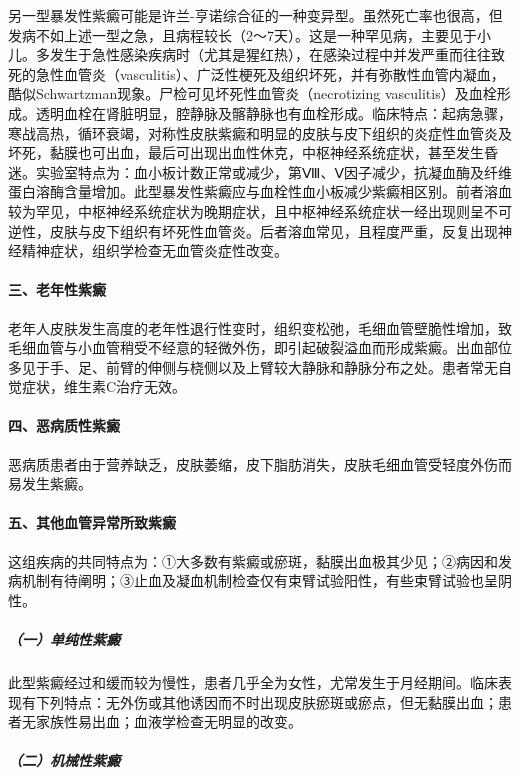另一型暴发性紫癜可能是许兰-亨诺综合征的一种变异型。虽然死亡率也很高，但发病不如上述一型之急，且病程较长（2～7天）。这是一种罕见病，主要见于小儿。多发生于急性感染疾病时（尤其是猩红热），在感染过程中并发严重而往往致死的急性血管炎（vasculitis）、广泛性梗死及组织坏死，并有弥散性血管内凝血，酷似Schwartzman现象。尸检可见坏死性血管炎（necrotizing
vasculitis）及血栓形成。透明血栓在肾脏明显，腔静脉及髂静脉也有血栓形成。临床特点：起病急骤，寒战高热，循环衰竭，对称性皮肤紫癜和明显的皮肤与皮下组织的炎症性血管炎及坏死，黏膜也可出血，最后可出现出血性休克，中枢神经系统症状，甚至发生昏迷。实验室特点为：血小板计数正常或减少，第Ⅷ、Ⅴ因子减少，抗凝血酶及纤维蛋白溶酶含量增加。此型暴发性紫癜应与血栓性血小板减少紫癜相区别。前者溶血较为罕见，中枢神经系统症状为晚期症状，且中枢神经系统症状一经出现则呈不可逆性，皮肤与皮下组织有坏死性血管炎。后者溶血常见，且程度严重，反复出现神经精神症状，组织学检查无血管炎症性改变。

\paragraph{三、老年性紫癜}

老年人皮肤发生高度的老年性退行性变时，组织变松弛，毛细血管壁脆性增加，致毛细血管与小血管稍受不经意的轻微外伤，即引起破裂溢血而形成紫癜。出血部位多见于手、足、前臂的伸侧与桡侧以及上臂较大静脉和静脉分布之处。患者常无自觉症状，维生素C治疗无效。

\paragraph{四、恶病质性紫癜}

恶病质患者由于营养缺乏，皮肤萎缩，皮下脂肪消失，皮肤毛细血管受轻度外伤而易发生紫癜。

\paragraph{五、其他血管异常所致紫癜}

这组疾病的共同特点为：①大多数有紫癜或瘀斑，黏膜出血极其少见；②病因和发病机制有待阐明；③止血及凝血机制检查仅有束臂试验阳性，有些束臂试验也呈阴性。

\subparagraph{（一）单纯性紫癜}

此型紫癜经过和缓而较为慢性，患者几乎全为女性，尤常发生于月经期间。临床表现有下列特点：无外伤或其他诱因而不时出现皮肤瘀斑或瘀点，但无黏膜出血；患者无家族性易出血；血液学检查无明显的改变。

\subparagraph{（二）机械性紫癜}

